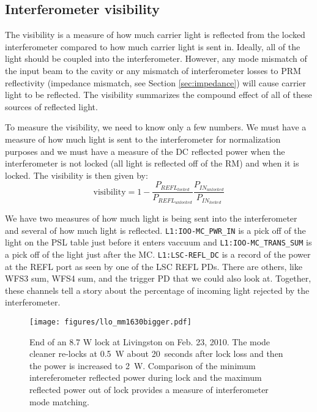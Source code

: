 \subsection{Interferometer visibility}
The visibility is a measure of how much carrier light is reflected from the
locked interferometer compared to how much carrier light is sent in. Ideally,
all of the light should be coupled into the interferometer. However,
any mode mismatch of the input beam to the cavity or any mismatch of
interferometer losses to PRM reflectivity (impedance mismatch, see
Section \ref{sec:impedance}) will
cause carrier light to be reflected. The visibility summarizes the
compound effect of all of these sources of reflected light.

To measure the visibility, we need to know only a few numbers. We must
have a measure of how much light is sent to the interferometer for
normalization purposes and we must have a measure of the DC reflected
power when the interferometer is not locked (all light is reflected
off of the RM) and when it is locked. The visibility is then given
by:
\begin{equation}
\mbox{visibility} = 1 -
\frac{P_{REFL_{locked}}}{P_{REFL_{unlocked}}} \frac{P_{IN_{unlocked}}}{P_{IN_{locked}}}
\end{equation}

We have two measures of how much light is being sent into the
interferometer and several of how much light is
reflected. \texttt{L1:IOO-MC\_PWR\_IN} is a pick off of the light on
the PSL table just before it 
enters vaccuum and \texttt{L1:IOO-MC\_TRANS\_SUM} is a pick off of the light just after
the MC. \texttt{L1:LSC-REFL\_DC} is a record of the power at the REFL
port as seen by one of the LSC REFL PDs. There are others, like WFS3
sum, WFS4 sum, and the trigger PD that we could also look at. Together, these channels tell
a story about the percentage of incoming light rejected by the interferometer.

\begin{figure}
\begin{centering}
\texttt{[image: figures/llo\_mm1630bigger.pdf]}
\caption[End of an 8.7 W lock at Livingston on Feb. 23, 2010]{End of
  an 8.7 W lock at Livingston on Feb. 23, 2010. The mode cleaner
  re-locks at 0.5~W about 20~seconds after lock loss and then the
  power is increased to 2~W. Comparison of the minimum intereferometer
  reflected power during lock and the maximum reflected power out of
  lock provides a measure of interferometer mode matching.}
\label{fig:llomm1630}
\end{centering}
\end{figure}

